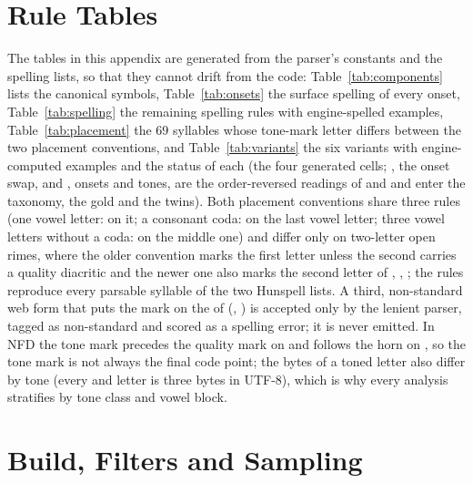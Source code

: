 

\section{Rule Tables}
\label{app:rules}

The tables in this appendix are generated from the parser's constants and the spelling lists, so that they cannot drift from the code: Table~\ref{tab:components} lists the canonical symbols, Table~\ref{tab:onsets} the surface spelling of every onset, Table~\ref{tab:spelling} the remaining spelling rules with engine-spelled examples, Table~\ref{tab:placement} the 69 syllables whose tone-mark letter differs between the two placement conventions, and Table~\ref{tab:variants} the six variants with engine-computed examples and the status of each (the four generated  cells; , the onset swap, and , onsets and tones, are the order-reversed readings of  and  and enter the taxonomy, the  gold and the  twins). Both placement conventions share three rules (one vowel letter: on it; a consonant coda: on the last vowel letter; three vowel letters without a coda: on the middle one) and differ only on two-letter open rimes, where the older convention marks the first letter unless the second carries a quality diacritic and the newer one also marks the second letter of , , ; the rules reproduce every parsable syllable of the two Hunspell lists. A third, non-standard web form that puts the mark on the  of  (, ) is accepted only by the lenient parser, tagged as non-standard and scored as a spelling error; it is never emitted. In NFD the tone mark precedes the quality mark on  and follows the horn on , so the tone mark is not always the final code point; the bytes of a toned letter also differ by tone (every  and  letter is three bytes in UTF-8), which is why every analysis stratifies by tone class and vowel block.







\section{Build, Filters and Sampling}
\label{app:build}


